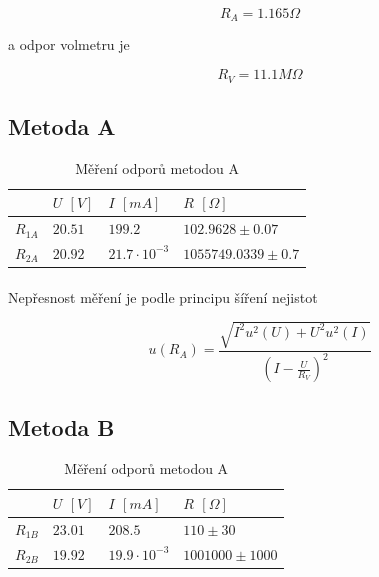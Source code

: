 \documentclass[a4paper,11pt]{article}
\begin{document}
    $$
        R_{A} = 1.165 \Omega
    $$

    a odpor volmetru je

    $$
        R_{V} = 11.1 M\Omega
    $$

    \subsection{Metoda A}

        \begin{table}[h]
            \centering
            \begin{tabular}{ | l || l | l || l | }
                \hline
                        & $U$ $[V]$ & $I$ $[mA]$             & $R$ $[\Omega]$    \\ \hline
                $R_{1A}$ & $20.51$   & $199.2$               & $102.9628 \pm 0.07$         \\ \hline
                $R_{2A}$ & $20.92$   & $21.7 \cdot 10^{-3}$  & $1055749.0339 \pm 0.7$      \\
                \hline
            \end{tabular}
            \caption{Měření odporů metodou A}
            \label{fig:method_b}
        \end{table}

        \paragraph{} Nepřesnost měření je podle principu šíření nejistot

        \begin{equation}
            u(R_{A}) = \frac{\sqrt{I^{2} u^{2}(U) + U^{2} u^{2}(I)}}{(I - \frac{U}{R_{V}})^{2}}
        \end{equation}

        \paragraph{}

    \subsection{Metoda B}

        \begin{table}[h]
            \centering
            \begin{tabular}{ | l || l | l || l | }
                \hline
                        & $U$ $[V]$ & $I$ $[mA]$             & $R$ $[\Omega]$     \\ \hline
                $R_{1B}$ & $23.01$   & $208.5$               & $110 \pm 30$  \\ \hline
                $R_{2B}$ & $19.92$   & $19.9 \cdot 10^{-3}$  & $1001000 \pm 1000$\\
                \hline
            \end{tabular}
            \caption{Měření odporů metodou A}
            \label{fig:method_b}
        \end{table}
\end{document}
